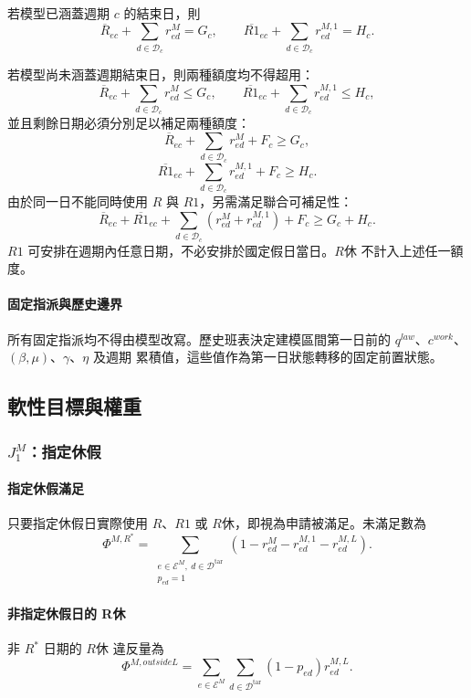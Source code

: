 \documentclass[a4paper,12pt]{article}
\begin{document}
若模型已涵蓋週期 \(c\) 的結束日，則
\[
  \overline{R}_{ec}
  +\sum_{d\in\mathcal{D}_c}r^{M}_{ed}
  =G_c,
  \qquad
  \overline{R1}_{ec}
  +\sum_{d\in\mathcal{D}_c}r^{M,1}_{ed}
  =H_c.
\]

若模型尚未涵蓋週期結束日，則兩種額度均不得超用：
\[
  \overline{R}_{ec}+\sum_{d\in\mathcal{D}_c}r^{M}_{ed}\leq G_c,
  \qquad
  \overline{R1}_{ec}+\sum_{d\in\mathcal{D}_c}r^{M,1}_{ed}\leq H_c,
\]
並且剩餘日期必須分別足以補足兩種額度：
\[
  \overline{R}_{ec}+\sum_{d\in\mathcal{D}_c}r^{M}_{ed}+F_c\geq G_c,
\]
\[
  \overline{R1}_{ec}+\sum_{d\in\mathcal{D}_c}r^{M,1}_{ed}+F_c\geq H_c.
\]
由於同一日不能同時使用 \(R\) 與 \(R1\)，另需滿足聯合可補足性：
\[
  \overline{R}_{ec}+\overline{R1}_{ec}
  +\sum_{d\in\mathcal{D}_c}\left(r^{M}_{ed}+r^{M,1}_{ed}\right)
  +F_c
  \geq G_c+H_c.
\]
\(R1\) 可安排在週期內任意日期，不必安排於國定假日當日。\(R休\) 不計入上述任一額度。

\paragraph{固定指派與歷史邊界}
所有固定指派均不得由模型改寫。歷史班表決定建模區間第一日前的
\(q^{law}\)、\(c^{work}\)、\((\beta,\mu)\)、\(\gamma\)、\(\eta\) 及週期
累積值，這些值作為第一日狀態轉移的固定前置狀態。

\subsection{軟性目標與權重}

\subsubsection{\texorpdfstring{$J^M_1$}{J1}：指定休假}

\paragraph{指定休假滿足}
只要指定休假日實際使用 \(R\)、\(R1\) 或 \(R休\)，即視為申請被滿足。未滿足數為
\[
  \Phi^{M,R^*}
  =
  \sum_{\substack{e\in\mathcal{E}^{M},\ d\in\mathcal{D}^{\mathrm{tar}}\\p_{ed}=1}}
  \left(1-r^{M}_{ed}-r^{M,1}_{ed}-r^{M,L}_{ed}\right).
\]

\paragraph{非指定休假日的 R休}
非 \(R^*\) 日期的 \(R休\) 違反量為
\[
  \Phi^{M,outsideL}
  =\sum_{e\in\mathcal{E}^{M}}\sum_{d\in\mathcal{D}^{\mathrm{tar}}}(1-p_{ed})r^{M,L}_{ed}.
\]
\end{document}
